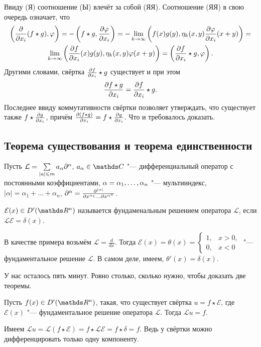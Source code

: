 \begin{Proof}
  Ввиду (Я) соотношение (Ы) влечёт за собой (ЯЯ). Соотношение (ЯЯ) в свою очередь означает, что
\begin{multline*}
  \left( \frac{\partial }{\partial x_i}(f\star g),\varphi\right) = -\left(f\star g,\frac{\partial \varphi}{\partial x_i}\right) = 
 -\lim\limits_{k\rightarrow\infty} \left(f(x)g(y),\eta_k(x,y)\frac{\partial \varphi}{\partial x_i}(x+y)\right) =\\
  \lim\limits_{k\rightarrow\infty} \left(\frac{\partial f}{\partial x_i}(x)g(y),\eta_k(x,y)\varphi(x+y)\right) = \left(\frac{\partial f}{\partial x_i}\star g,\varphi\right).
\end{multline*}
Другими словами, свёртка $\frac{\partial f}{\partial x_i}\star g$ существует и при этом
 \[
  \frac{\partial f\star g}{\partial x_i} = \frac{\partial f}{\partial x_i}\star g.
 \]
Последнее ввиду коммутативности свёртки позволяет утверждать, что существует также $f\star \frac{\partial g}{\partial x_i}$, причём $\frac{\partial (f\star g)}{\partial x_i} = f\star\frac{\partial g}{\partial x_i}$. Что и требовалось доказать.
\end{Proof}

\subsection{Теорема существования и теорема единственности}
Пусть $\mathcal L = \sum\limits_{|a|\leqslant m}a_\alpha\partial^\alpha$, $a_\alpha\in \C$ "--- дифференциальный оператор с постоянными коэффициентами, $\alpha \hm= \ve \alpha n$ "--- мультииндекс, $|\alpha| = \alpha_1+\ldots+\alpha_n$, $\partial^\alpha =\frac{\partial ^{|\alpha|}}{\partial x^{\alpha_1}\dots\partial x^{\alpha^n}}$.

\begin{Def}
  $\mathcal E(x)\in D'(\R^n)$ называется фундаменальным решением оператора $\mathcal L$, если $\mathcal L \mathcal E = \delta(x)$.
\end{Def}

В качестве примера возьмём $\mathcal L = \frac{d}{dx}$. Тогда $\mathcal E(x) = \theta(x) = \begin{cases}1,&x>0,\\0,&x<0\end{cases}$ "--- фундаментальное решение $\mathcal L$. В самом деле, имеем, $\theta'(x) = \delta(x)$.

У нас осталось пять минут. Ровно столько, сколько нужно, чтобы доказать две теоремы.
\begin{The}
  Пусть $f(x)\in D'(\R^n)$, такая, что существует свёртка $u = f\star \mathcal E$, где $\mathcal E(x)$ "--- фундаментальное решение оператора $\mathcal L$. Тогда $\mathcal L u = f$.
\end{The}
\begin{Proof}
  Имеем $\mathcal L u = \mathcal L(f\star \mathcal E) = f\star \mathcal L \mathcal E = f\star \delta = f$. Ведь у свёртки можно дифференцировать только одну компоненту.
\end{Proof}

